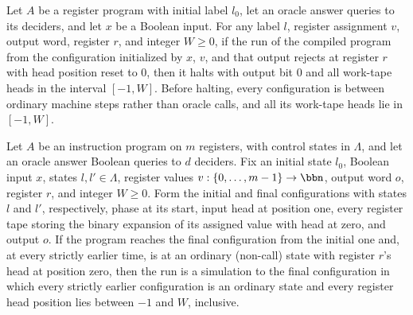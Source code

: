 \begin{lemma}
\label{Complexity.LogProg.haltsWith_of_rejects}
\leanok
{}
Let $A$ be a register program with initial label $l_0$, let an oracle answer queries to
its deciders, and let $x$ be a Boolean input. For any label $l$, register assignment
$v$, output word, register $r$, and integer $W\ge 0$, if the run of the compiled program
from the configuration initialized by $x$, $v$, and that output rejects at register $r$
with head position reset to $0$, then it halts with output bit $0$ and all work-tape
heads in the interval $[-1,W]$. Before halting, every configuration is between ordinary
machine steps rather than oracle calls, and all its work-tape heads lie in $[-1,W]$.
\end{lemma}

\begin{lemma}
\label{Complexity.LogProg.simTo_of_reaches}
\leanok
{}
Let $A$ be an instruction program on $m$ registers, with control states in $\Lambda$,
and let an oracle answer Boolean queries to $d$ deciders. Fix an initial state $l_0$,
Boolean input $x$, states $l,l'\in\Lambda$, register values $v:\{0,\ldots,m-1\}\to\bbn$,
output word $o$, register $r$, and integer $W\ge 0$. Form the initial and final
configurations with states $l$ and $l'$, respectively, phase at its start, input head at
position one, every register tape storing the binary expansion of its assigned value
with head at zero, and output $o$. If the program reaches the final configuration from
the initial one and, at every strictly earlier time, is at an ordinary (non-call) state
with register $r$'s head at position zero, then the run is a simulation to the final
configuration in which every strictly earlier configuration is an ordinary state and
every register head position lies between $-1$ and $W$, inclusive.
\end{lemma}

